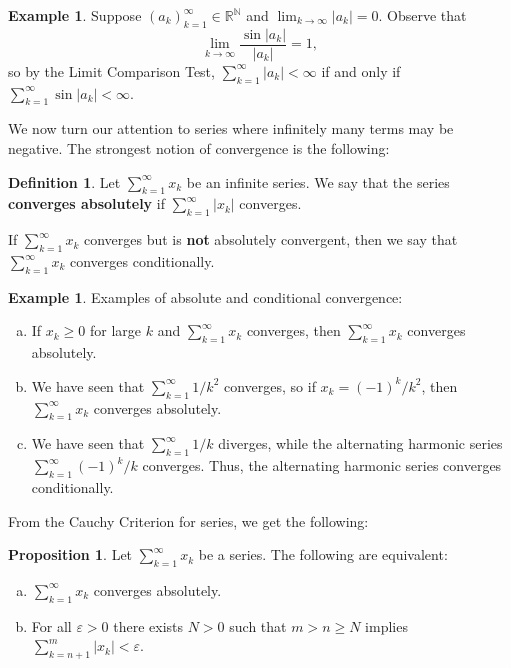 \documentclass[11pt]{article}
\theoremstyle{definition}
\newtheorem{defn}[thm]{Definition}
\newtheorem{exmp}[thm]{Example}
\newtheorem{prop}[thm]{Proposition}
\newcommand{\mbN}{\ensuremath{\mathbb{N}}}
\newcommand{\mbR}{\ensuremath{\mathbb{R}}}
\begin{document}
\begin{exmp}
Suppose $(a_k)_{k=1}^\infty \in \mbR^\mbN$ and $\lim_{k\to\infty} |a_k| = 0$. Observe that
$$\lim_{k\to\infty} \frac{\sin|a_k|}{|a_k|} = 1,$$
so by the Limit Comparison Test, $\sum_{k=1}^\infty |a_k| < \infty$ if and only if $\sum_{k=1}^\infty \sin|a_k| < \infty$.
\end{exmp}

We now turn our attention to series where infinitely many terms may be negative. The strongest notion of convergence is the following:

\begin{defn}
Let $\sum_{k=1}^\infty x_k$ be an infinite series. We say that the series \textbf{converges absolutely} if $\sum_{k=1}^\infty |x_k|$ converges. 

If $\sum_{k=1}^\infty x_k$ converges but is \textbf{not} absolutely convergent, then we say that $\sum_{k=1}^\infty x_k$ converges conditionally.
\end{defn}

\begin{exmp}
Examples of absolute and conditional convergence:
\begin{enumerate}[(a)]
\item If $x_k \geq 0$ for large $k$ and $\sum_{k=1}^\infty x_k$ converges, then $\sum_{k=1}^\infty x_k$ converges absolutely. 
\item We have seen that $\sum_{k=1}^\infty 1/k^2$ converges, so if $x_k = (-1)^k/k^2$, then $\sum_{k=1}^\infty x_k$ converges absolutely. 
\item We have seen that $\sum_{k=1}^\infty 1/k$ diverges, while the alternating harmonic series $\sum_{k=1}^\infty (-1)^k/k$ converges. Thus, the alternating harmonic series converges conditionally.
\end{enumerate}
\end{exmp}

From the Cauchy Criterion for series, we get the following:
\begin{prop}
Let $\sum_{k=1}^\infty x_k$ be a series. The following are equivalent:
\begin{enumerate}[(a)] \vspace{-0.2cm}
\item $\sum_{k=1}^\infty x_k$ converges absolutely.
\item For all $\varepsilon > 0$ there exists $N > 0$ such that $m > n \geq N$ implies $\sum_{k=n+1}^m |x_k| < \varepsilon$. 
\end{enumerate}
\end{prop}
\end{document}
